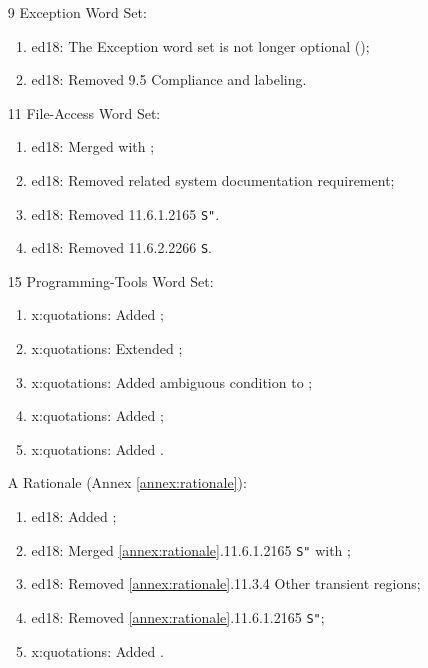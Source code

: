 \begin{itemize}
	\item[9] Exception Word Set:				%
	\begin{enumerate}
		\item \textsf{ed18}: The Exception word set is not longer optional ();
		\item \textsf{ed18}: Removed 9.5 Compliance and labeling.
	\end{enumerate}

	\item[11] File-Access Word Set:			%
	\begin{enumerate}
		\item \textsf{ed18}: Merged  with ;
		\item \textsf{ed18}: Removed  related system documentation
			 requirement;
		\item \textsf{ed18}: Removed 11.6.1.2165 \texttt{S"}.
		\item \textsf{ed18}: Removed 11.6.2.2266 \texttt{S}.
	\end{enumerate}

	\item[15] Programming-Tools Word Set:	%
	\begin{enumerate}
		\item \textsf{x:quotations}: Added ;
		\item \textsf{x:quotations}: Extended ;
		\item \textsf{x:quotations}: Added ambiguous condition to ;
		\item \textsf{x:quotations}: Added \wref{tools:;]}{};
		\item \textsf{x:quotations}: Added \wref{tools:[:}{}.
	\end{enumerate}

	\item[A] Rationale (Annex \ref{annex:rationale}):	%
	\begin{enumerate}
		\item \textsf{ed18}: Added ;
		\item \textsf{ed18}: Merged \ref{annex:rationale}.11.6.1.2165 \texttt{S"} with ;
		\item \textsf{ed18}: Removed \ref{annex:rationale}.11.3.4 Other transient regions;
		\item \textsf{ed18}: Removed \ref{annex:rationale}.11.6.1.2165 \texttt{S"};
		\item \textsf{x:quotations}: Added \rref{tools:[:}{}.
		\end{enumerate}


\end{itemize}
